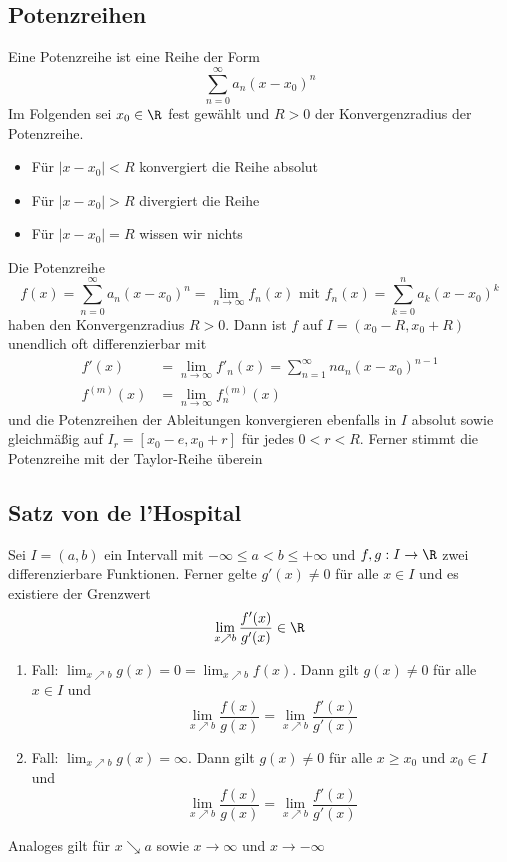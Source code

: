 	\subsection{Potenzreihen}
		\begin{Definition} [ Potenzreihen]
			Eine Potenzreihe ist eine Reihe der Form
			$$
				\sum_{n=0}^\infty a_n(x-x_0)^n
			$$
			Im Folgenden sei $x_0\in\R$ fest gewählt und $R>0$ der Konvergenzradius der Potenzreihe.
			\begin{itemize}
				\item Für $|x-x_0|<R$ konvergiert die Reihe absolut
				\item Für $|x-x_0|>R$ divergiert die Reihe
				\item Für $|x-x_0|=R$ wissen wir nichts
			\end{itemize}
		\end{Definition}
		\begin{Satz} [ ]
			Die Potenzreihe
			$$
				f(x)=\sum_{n=0}^\infty a_n(x-x_0)^n=\lim_{n\to\infty}f_n(x) \text{ mit } f_n(x)=\sum_{k=0}^na_k(x-x_0)^k
			$$
			haben den Konvergenzradius $R>0$. Dann ist $f$ auf $I=(x_0-R,x_0+R)$ unendlich oft differenzierbar mit
			\begin{align*}
				f'(x)&=\lim_{n\to\infty}f'_n(x)=\sum_{n=1}^\infty na_n(x-x_0)^{n-1} \\
				f^{(m)}(x)&=\lim_{n\to\infty}f_n^{(m)}(x)
			\end{align*}
			und die Potenzreihen der Ableitungen konvergieren ebenfalls in $I$ absolut sowie gleichmäßig auf $I_r=[x_0-e,x_0+r]$ für jedes $0<r<R$. Ferner stimmt die Potenzreihe mit der Taylor-Reihe überein
		\end{Satz}
	\subsection{Satz von de l'Hospital}
		\begin{Satz} 
			Sei $I=(a,b)$ ein Intervall mit $-\infty\leq a < b \leq +\infty$ und $f, g: I\to\R$ zwei differenzierbare Funktionen. Ferner gelte $g'(x)\not=0$ für alle $x\in I$ und es existiere der Grenzwert
			$$
				\lim_{x\nearrow b}\frac{f'(x)}{g'(x)}\in\R
			$$
			\begin{enumerate}
				\item  Fall: $\displaystyle\lim_{x\nearrow b}g(x)=0=\displaystyle\lim_{x\nearrow b}f(x)$. Dann gilt $g(x)\not = 0$ für alle $x\in I$ und
				$$
					\lim_{x\nearrow b}\frac{f(x)}{g(x)}=\lim_{x\nearrow b}\frac{f'(x)}{g'(x)}
				$$
				\item Fall: $\displaystyle\lim_{x\nearrow b}g(x)=\infty$. Dann gilt $g(x)\not=0$ für alle $x\geq x_0$ und $x_0\in I$ und
				$$
					\lim_{x\nearrow b}\frac{f(x)}{g(x)}=\lim_{x\nearrow b}\frac{f'(x)}{g'(x)}
				$$
			\end{enumerate}
			Analoges gilt für $x\searrow a$ sowie $x\to\infty$ und $x\to-\infty$
		\end{Satz}